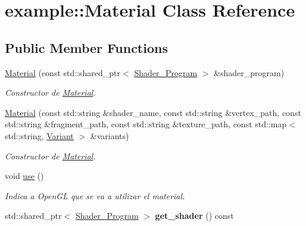 \hypertarget{classexample_1_1_material}{}\section{example\+::Material Class Reference}
\label{classexample_1_1_material}
\subsection*{Public Member Functions}
\begin{DoxyCompactItemize}
\item 
\mbox{\hyperlink{classexample_1_1_material_ad3e99abb9dc569c6c3ed8491f214d681}{Material}} (const std\+::shared\+\_\+ptr$<$ \mbox{\hyperlink{classexample_1_1_shader___program}{Shader\+\_\+\+Program}} $>$ \&shader\+\_\+program)
\begin{DoxyCompactList}\small\item\em Constructor de \mbox{\hyperlink{classexample_1_1_material}{Material}}. \end{DoxyCompactList}\item 
\mbox{\hyperlink{classexample_1_1_material_a7d1c4c3f80caae091c5a1112f992dbec}{Material}} (const std\+::string \&shader\+\_\+name, const std\+::string \&vertex\+\_\+path, const std\+::string \&fragment\+\_\+path, const std\+::string \&texture\+\_\+path, const std\+::map$<$ std\+::string, \mbox{\hyperlink{structexample_1_1_variant}{Variant}} $>$ \&variants)
\begin{DoxyCompactList}\small\item\em Constructor de \mbox{\hyperlink{classexample_1_1_material}{Material}}. \end{DoxyCompactList}\item 
void \mbox{\hyperlink{classexample_1_1_material_a133e88535b7d1643501493ea97634f00}{use}} ()
\begin{DoxyCompactList}\small\item\em Indica a Open\+GL que se va a utilizar el material. \end{DoxyCompactList}\item 
\mbox{\label{classexample_1_1_material_aa75e094d80c6b21e6b3a5e5efd36469c}} 
std\+::shared\+\_\+ptr$<$ \mbox{\hyperlink{classexample_1_1_shader___program}{Shader\+\_\+\+Program}} $>$ {\bfseries get\+\_\+shader} () const
\item 
\mbox{\label{classexample_1_1_material_af665e88da873a3bf97cb2bf11a462204}} 

\end{DoxyCompactItemize}

